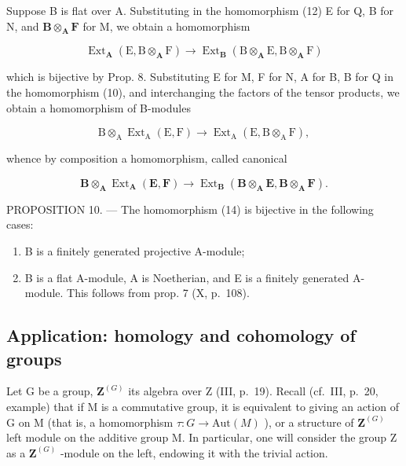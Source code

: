 Suppose B is flat over A. Substituting in the homomorphism (12) E for Q, B for N, and \(\mathbf{B} \otimes_{\mathbf{A}} \mathbf{F}\) for M, we obtain a homomorphism

\[
\operatorname{Ext} _ {\mathbf {A}} \left(\mathrm{E}, \mathrm{B} \otimes_ {\mathbf {A}} \mathrm{F}\right)\rightarrow \operatorname{Ext} _ {\mathbf {B}} \left(\mathrm{B} \otimes_ {\mathbf {A}} \mathrm{E}, \mathrm{B} \otimes_ {\mathbf {A}} \mathrm{F}\right)
\]

which is bijective by Prop. 8. Substituting E for M, F for N, A for B, B for Q in the homomorphism (10), and interchanging the factors of the tensor products, we obtain a homomorphism of B-modules

\[
\mathrm{B} \otimes_ {\mathrm{A}} \operatorname{Ext} _ {\mathrm{A}} (\mathrm{E}, \mathrm{F}) \rightarrow \operatorname{Ext} _ {\mathrm{A}} (\mathrm{E}, \mathrm{B} \otimes_ {\mathrm{A}} \mathrm{F}),
\]

whence by composition a homomorphism, called canonical

\[
\mathbf {B} \otimes_ {\mathbf {A}} \operatorname{Ext} _ {\mathbf {A}} (\mathbf {E}, \mathbf {F}) \rightarrow \operatorname{Ext} _ {\mathbf {B}} (\mathbf {B} \otimes_ {\mathbf {A}} \mathbf {E}, \mathbf {B} \otimes_ {\mathbf {A}} \mathbf {F}).\tag{14}
\]

PROPOSITION 10. --- The homomorphism (14) is bijective in the following cases:

\begin{enumerate}
\def\labelenumi{\alph{enumi})}
\item
  B is a finitely generated projective A-module;
\item
  B is a flat A-module, A is Noetherian, and E is a finitely generated A-module. This follows from prop. 7 (X, p.~108).
\end{enumerate}

\subsection{Application: homology and cohomology of groups}

Let G be a group, \(\mathbf{Z}^{(G)}\) its algebra over Z (III, p.~19). Recall (cf.~III, p.~20, example) that if M is a commutative group, it is equivalent to giving an action of G on M (that is, a homomorphism \(\tau: G \to \text{Aut}(M)\) ), or a structure of \(\mathbf{Z}^{(G)}\) left module on the additive group M. In particular, one will consider the group Z as a \(\mathbf{Z}^{(G)}\) -module on the left, endowing it with the trivial action.

